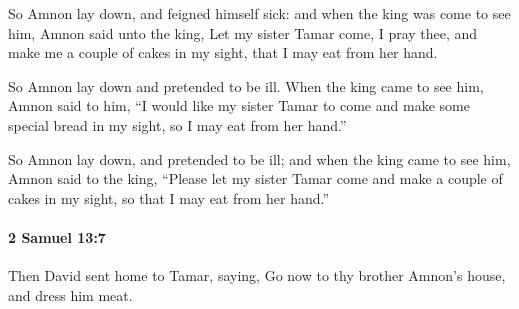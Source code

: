 			\begin{versebox}
					\item[BHS] 
					\item[ASV] So Amnon lay down, and feigned himself sick: and when the king was come to see him, Amnon said unto the king, Let my sister Tamar come, I pray thee, and make me a couple of cakes in my sight, that I may eat from her hand.
					\item[NIV] So Amnon lay down and pretended to be ill. When the king came to see him, Amnon said to him, “I would like my sister Tamar to come and make some special bread in my sight, so I may eat from her hand.”
					\item[NRSV] So Amnon lay down, and pretended to be ill; and when the king came to see him, Amnon said to the king, “Please let my sister Tamar come and make a couple of cakes in my sight, so that I may eat from her hand.”
			\end{versebox}

		\paragraph{2 Samuel 13:7} %
			\label{2SAMUEL-13-7}

			Then David sent home to Tamar, saying, Go now to thy brother Amnon’s house, and dress him meat.

